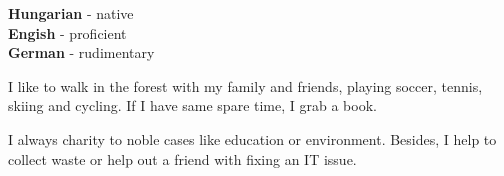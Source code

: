 \documentclass[9pt]{developercv} %
\begin{document}
\begin{minipage}[t]{0.3\textwidth}
	\vspace{-\baselineskip} %

	
	\textbf{Hungarian} - native\\
	\textbf{Engish} - proficient\\
	\textbf{German} - rudimentary
\end{minipage}
\hfill
\begin{minipage}[t]{0.3\textwidth}
	\vspace{-\baselineskip} %
	
	
	I like to walk in the forest with my family and friends, playing soccer, tennis, skiing and cycling. If I have same spare time, I grab a book.
\end{minipage}
\hfill
\begin{minipage}[t]{0.3\textwidth}
	\vspace{-\baselineskip} %
	
	
	I always charity to noble cases like education or environment. Besides, I help to collect waste or help out a friend with fixing an IT issue.
\end{minipage}

\end{document}
